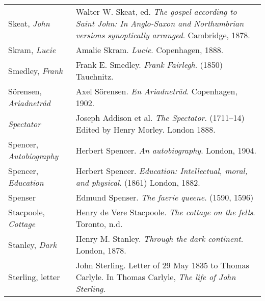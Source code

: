 \begin{longtable}{p{} p{}}
Skeat, \textit{John} & Walter W. Skeat, ed. \textit{The gospel according to Saint John: In Anglo-Saxon and Northumbrian versions synoptically arranged}. Cambridge, 1878. \\ %

Skram, \textit{Lucie} & Amalie Skram. \textit{Lucie}. Copenhagen, 1888. \\

Smedley, \textit{Frank} & Frank E. Smedley. \textit{Frank Fairlegh}. (1850) Tauchnitz. \\

Sörensen, \textit{Ariadnetråd} & Axel Sörensen. \textit{En Ariadnetråd}. Copenhagen, 1902.  \\ %

\textit{Spectator} & Joseph Addison et al. \textit{The Spectator}. (1711--14) Edited by Henry Morley. London 1888. \\ %

Spencer, \textit{Autobiography} & Herbert Spencer. \textit{An autobiography}. London, 1904. \\
Spencer, \textit{Education} & Herbert Spencer. \textit{Education: Intellectual, moral, and physical}. (1861) London, 1882. \\ 

Spenser & Edmund Spenser. \textit{The faerie queene}. (1590, 1596) \\

Stacpoole, \textit{Cottage} & Henry de Vere Stacpoole. \textit{The cottage on the fells}. Toronto, n.d. \\

Stanley, \textit{Dark} & Henry M. Stanley. \textit{Through the dark continent}. London, 1878. \\

Sterling, letter & John Sterling. Letter of 29 May 1835 to Thomas Carlyle. In Thomas Carlyle, \textit{The life of John Sterling}. \\


\end{longtable}
